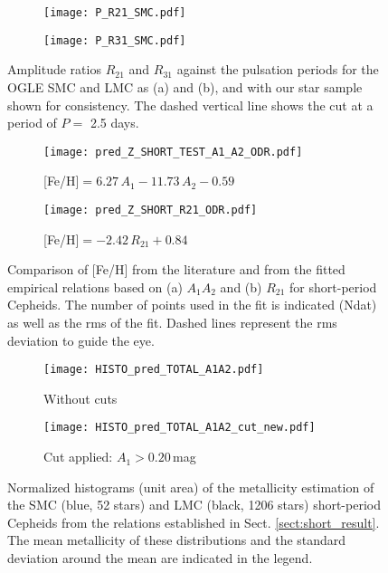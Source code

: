 \documentclass[article]{aa} %
\begin{document}
\begin{figure*} %
\begin{subfigure}{0.52\textwidth}
\texttt{[image: P\_R21\_SMC.pdf]}
\caption{} \label{fig:P_R21}
\end{subfigure}\hspace*{\fill}
\begin{subfigure}{0.52\textwidth}
\texttt{[image: P\_R31\_SMC.pdf]}
\caption{} \label{fig:P_R31}
\end{subfigure}
 \caption{Amplitude ratios $R_{21}$ and $R_{31}$ against the pulsation periods for the OGLE SMC and LMC as (a) and (b), and with our star sample shown for consistency. The dashed vertical line shows the cut at a period of $P=$ 2.5 days.} 
\end{figure*}





\begin{figure*} %

\begin{subfigure}{0.52\textwidth}
\texttt{[image: pred\_Z\_SHORT\_TEST\_A1\_A2\_ODR.pdf]}
\caption{[Fe/H]$=6.27\,A_{1} -11.73\,A_{2} -0.59$} \label{fig:fit_A1A2}
\end{subfigure}\hspace*{\fill}
\begin{subfigure}{0.52\textwidth}
\texttt{[image: pred\_Z\_SHORT\_R21\_ODR.pdf]}
\caption{[Fe/H]$=-2.42\,R_{21} + 0.84$} \label{fig:fit_R21}
\end{subfigure}


\caption{Comparison of [Fe/H] from the literature and from the fitted empirical relations based on (a) $A_1A_2$ and (b) $R_{21}$ for short-period Cepheids. The number of points used in the fit is indicated (Ndat) as well as the rms of the fit. Dashed lines represent the rms deviation to guide the eye. \label{fig:results_fit_short}}
\end{figure*}


\begin{figure*} %

\begin{subfigure}{0.52\textwidth}
\texttt{[image: HISTO\_pred\_TOTAL\_A1A2.pdf]}
\caption{Without cuts} \label{fig:histo_pred_A1A2}
\end{subfigure}\hspace*{\fill}
\begin{subfigure}{0.52\textwidth}
\texttt{[image: HISTO\_pred\_TOTAL\_A1A2\_cut\_new.pdf]}
\caption{Cut applied: $A_1>0.20\,$mag} \label{fig:histo_pred_A1A2_cuts}
\end{subfigure}
\caption{Normalized histograms (unit area)  of the metallicity estimation of the SMC (blue, 52 stars) and LMC (black, 1206 stars) short-period Cepheids from the relations established in Sect. \ref{sect:short_result}. The mean metallicity of these distributions and the standard deviation around the mean are indicated in the legend. \label{fig:result_pred_short}}
\end{figure*}
\end{document}
